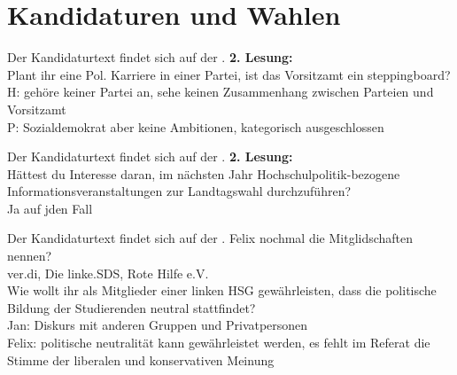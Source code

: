 \section{Kandidaturen und Wahlen}

    {
    Der Kandidaturtext findet sich auf der \kandidaturenseite.
    }{
        \textbf{2. Lesung:}\\
        Plant ihr eine Pol. Karriere in einer Partei, ist das Vorsitzamt ein steppingboard?\\
            H: gehöre keiner Partei an, sehe keinen Zusammenhang zwischen Parteien und Vorsitzamt\\
            P: Sozialdemokrat aber keine Ambitionen, kategorisch ausgeschlossen\\
    }

    {
        Der Kandidaturtext findet sich auf der \kandidaturenseite.
    }{
        \textbf{2. Lesung:}\\
        Hättest du Interesse daran, im nächsten Jahr Hochschulpolitik-bezogene Informationsveranstaltungen zur Landtagswahl durchzuführen?\\
            Ja auf jden Fall
    }

    {
        Der Kandidaturtext findet sich auf der \kandidaturenseite.
    }{
        Felix nochmal die Mitglidschaften nennen?\\
            ver.di, Die linke.SDS, Rote Hilfe e.V.\\
        Wie wollt ihr als Mitglieder einer linken HSG gewährleisten, dass die politische Bildung der Studierenden neutral stattfindet?\\
            Jan: Diskurs mit anderen Gruppen und Privatpersonen\\
            Felix: politische neutralität kann gewährleistet werden, es fehlt im Referat die Stimme der liberalen und konservativen Meinung
    }

